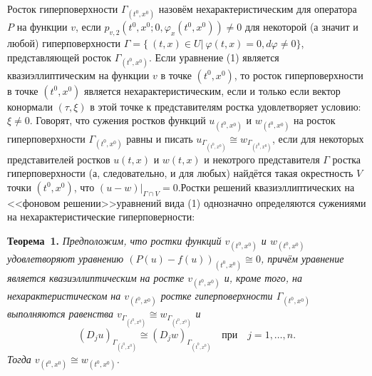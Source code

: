 Росток гиперповерхности $\Gamma_{(t^0,x^0)}$ назовём нехарактеристическим
для оператора $P$ на функции $v$, если
$p_{v,2}(t^0,x^0;0,\varphi_{x}(t^0,x^0))\not=0$
для некоторой (а значит и любой) гиперповерхности 
$\Gamma= \{~(t,x) \in U \vert~\varphi (t,x) =0, d\varphi\not=0\}$, представляющей росток $\Gamma_{(t^0,x^0)}$.
Если уравнение (1) является квазиэллиптическим на функции $v$ в точке $(t^0,x^0)$, то росток гиперповерхности в точке $(t^0,x^0)$ является нехарактеристическим, если и только если вектор конормали $(\tau,\xi)$ в этой точке к представителям ростка удовлетворяет условию: $\xi\not=0$.
Говорят, что сужения ростков функций $u_{(t^0,x^0)}$ и $w_{(t^0,x^0)}$
на росток гиперповерхности $\Gamma_{(t^0,x^0)}$ равны и писать
$u_{\Gamma_{(t^0,x^0)}}\cong w_{\Gamma_{(t^0,x^0)}}$,
если для некоторых представителей ростков $u(t,x)$ и $w(t,x)$  и некотрого представителя $\Gamma$ ростка гиперповерхности (а, следовательно, и для любых)
найдётся такая окрестность $V$ точки $(t^0,x^0)$,
что $(u-w)|_{\Gamma\cap V}=0$.\linebreak Ростки решений квазиэллиптических на <<фоновом решении>>\linebreak уравнений вида (1) однозначно определяются сужениями на нехарактеристические гиперповерности:


\textbf{Теорема~1.} {\it
Предположим, что ростки функций $v_{(t^0,x^0)}$ и $w_{(t^0,x^0)}$ удовлетворяют уравнению $(P(u)-f(u))_{(t^0,x^0)}\cong 0$, причём уравнение
является квазиэллиптическим на ростке $v_{(t^0,x^0)}$ и, кроме того, на нехарактеристическом на $v_{(t^0,x^0)}$ ростке гиперповерхности
$\Gamma_{(t^0,x^0)}$ выполняются равенства
$v_{\Gamma_{(t^0,x^0)}}\cong w_{\Gamma_{(t^0,x^0)}}$ и
$$
(D_ju)_{\Gamma_{(t^0,x^0)}}\cong (D_jw)_{\Gamma_{(t^0,x^0)}} \mbox{~~~при~~~}
j=1,\dots,n.
$$
Тогда $v_{(t^0,x^0)}\cong w_{(t^0,x^0)}$.
}

